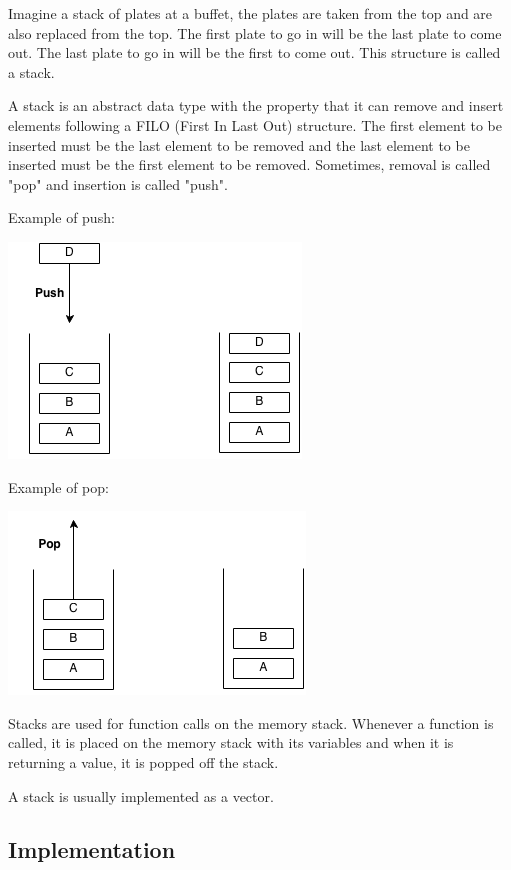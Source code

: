 \documentclass[11pt,oneside]{book}
\makeatletter
\def\maxwidth#1{\ifdim\Gin@nat@width>#1 #1\else\Gin@nat@width\fi}
\makeatother
\begin{document}
Imagine a stack of plates at a buffet, the plates are taken from the top and are also replaced from the top. The first plate to go in will be the last plate to come out. The last plate to go in will be the first to come out. This structure is called a stack.

A stack is an abstract data type with the property that it can remove and insert elements following a FILO (First In Last Out) structure. The first element to be inserted must be the last element to be removed and the last element to be inserted must be the first element to be removed. Sometimes, removal is called "pop" and insertion is called "push".

Example of push:

\includegraphics[width=\maxwidth{\textwidth}]{stack.png}

Example of pop:

\includegraphics[width=\maxwidth{\textwidth}]{stack2.png}

Stacks are used for function calls on the memory stack. Whenever a function is called, it is placed on the memory stack with its variables and when it is returning a value, it is popped off the stack.

A stack is usually implemented as a vector.

\subsection{Implementation}
\end{document}

